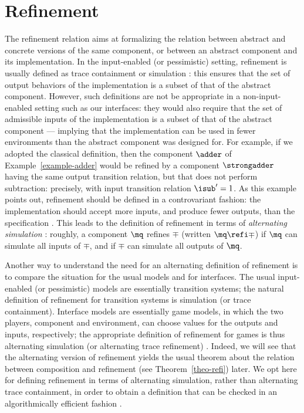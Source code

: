 \section{Refinement}

The refinement relation aims at formalizing the relation between
abstract and concrete versions of the same component, or between an
abstract component and its implementation.  
In the input-enabled (or pessimistic) setting, refinement is usually
defined as trace containment or simulation
\cite{Milner71}: this ensures that the set of output behaviors of the
implementation is a subset of that of the abstract component.  
However, such definitions are not be appropriate in a
non-input-enabled setting such as our interfaces: they would also
require that the set of admissible inputs of the implementation is a
subset of that of the abstract component --- implying that the
implementation can be used in fewer environments than the abstract
component was designed for.
%
For example, if we adopted the classical definition, then the
component $\adder$ of Example~\ref{example-adder} would be refined by
a component $\strongadder$ having the same output transition relation, 
but that does not perform subtraction: precisely, with input
transition relation $\isub' = 1$. 
%
As this example points out, refinement should be defined in a
controvariant fashion: the implementation should accept more inputs,
and produce fewer outputs, than the specification
\cite{luca-ia-01,luca-it-01}. 
This leads to the definition of refinement in terms of {\em alternating
simulation} \cite{CONCUR98AHKV}: roughly, a component $\mq$ refines
$\mp$ (written $\mq \refi \mp$) if $\mq$ can simulate all inputs of
$\mp$, and if $\mp$ can simulate all outputs of $\mq$. 

Another way to understand the need for an alternating definition of
refinement is to compare the situation for the usual models and for 
interfaces. 
The usual input-enabled (or pessimistic) models are essentially
transition systems; the natural definition of refinement for
transition systems is simulation (or trace containment). 
Interface models are essentially game models, in which the two
players, component and environment, can choose values for the
outputs and inputs, respectively; 
the appropriate definition of refinement for games is thus 
alternating simulation (or alternating trace refinement)
\cite{CONCUR98AHKV}. 
Indeed, we will see that the alternating version of refinement yields
the usual theorem about the relation between composition and
refinement (see Theorem~\ref{theo-refi}) later. 
We opt here for defining refinement in terms of alternating
simulation, rather than alternating trace containment, in order to
obtain a definition that can be checked in an algorithmically
efficient fashion \cite{CONCUR98AHKV}. 


